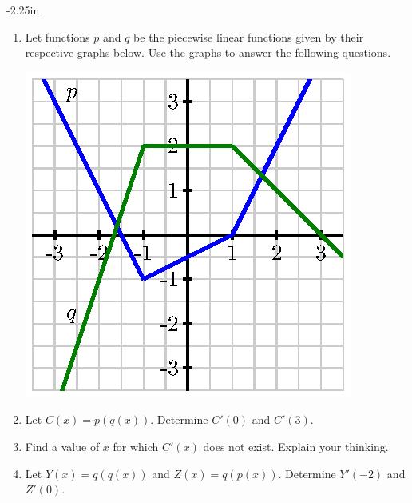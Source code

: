 \clearpage

\begin{adjustwidth*}{}{-2.25in}
\setlength{\columnsep}{25pt}
\begin{multicols*}{2}\small

\begin{enumerate}[1),start=30]
\item Let functions $p$ and $q$ be the piecewise linear functions given by their respective graphs below.  Use the graphs to answer the following questions.
\begin{center}
\includegraphics{figures/2_1_Ez3.eps}
\end{center}
\ba
	\item Let $C(x) = p(q(x))$.  Determine $C'(0)$ and $C'(3)$.
	\item Find a value of $x$ for which $C'(x)$ does not exist.  Explain your thinking.
	\item Let $Y(x) = q(q(x))$ and $Z(x) = q(p(x))$.  Determine $Y'(-2)$ and $Z'(0)$.	
\ea
\end{enumerate}

\end{multicols*}
\end{adjustwidth*}

\afterexercises